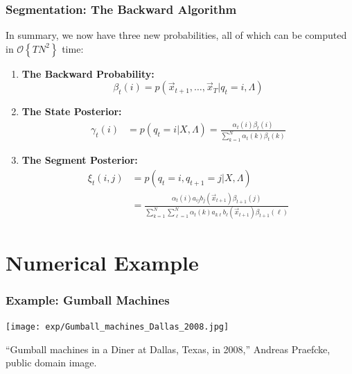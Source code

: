 \documentclass{beamer}
\begin{document}
\begin{frame}
  \frametitle{Segmentation: The Backward Algorithm}

  In summary, we now have three new probabilities, all of which can be
  computed in ${\mathcal O}\left\{TN^2\right\}$ time:
  \begin{enumerate}
  \item {\bf The Backward Probability:}
    \[
    \beta_t(i) = p(\vec{x}_{t+1},\ldots,\vec{x}_T|q_t=i,\Lambda)
    \]
  \item {\bf The State Posterior:}
    \begin{align*}
      \gamma_t(i) & = p(q_t=i|X,\Lambda)
      = \frac{\alpha_t(i)\beta_t(i)}{\sum_{k=1}^N\alpha_t(k)\beta_t(k)}
    \end{align*}
  \item {\bf The Segment Posterior:}
    \begin{align*}
      \xi_t(i,j) & = p(q_t=i,q_{t+1}=j|X,\Lambda)\\
      &= \frac{\alpha_t(i)a_{ij}b_j(\vec{x}_{t+1})\beta_{t+1}(j)}{\sum_{k=1}^N\sum_{\ell=1}^N\alpha_t(k)a_{k\ell}b_\ell(\vec{x}_{t+1})\beta_{t+1}(\ell)}
    \end{align*}
  \end{enumerate}
\end{frame}

\section[Example]{Numerical Example}
\setcounter{subsection}{1}

\begin{frame}
  \frametitle{Example: Gumball Machines}
  \centerline{\texttt{[image: exp/Gumball\_machines\_Dallas\_2008.jpg]}}
  \begin{tiny}
    ``Gumball machines in a Diner at Dallas, Texas, in 2008,'' Andreas Praefcke, public domain image.
  \end{tiny}
\end{frame}
\end{document}
